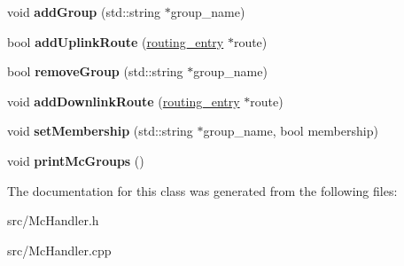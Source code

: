 \begin{DoxyCompactItemize}
\item 
\hypertarget{classMcHandler_a470f9c8360f7f57f626bad5de40489b5}{void {\bfseries add\-Group} (std\-::string $\ast$group\-\_\-name)}\label{classMcHandler_a470f9c8360f7f57f626bad5de40489b5}

\item 
\hypertarget{classMcHandler_a9d98dba49da2ef70676f1263798ed752}{bool {\bfseries add\-Uplink\-Route} (\hyperlink{structrouting__entry}{routing\-\_\-entry} $\ast$route)}\label{classMcHandler_a9d98dba49da2ef70676f1263798ed752}

\item 
\hypertarget{classMcHandler_aa84f097ecdf2b22011112dd85a1590d4}{bool {\bfseries remove\-Group} (std\-::string $\ast$group\-\_\-name)}\label{classMcHandler_aa84f097ecdf2b22011112dd85a1590d4}

\item 
\hypertarget{classMcHandler_a5b2c6085344056125d2499212b57e46a}{void {\bfseries add\-Downlink\-Route} (\hyperlink{structrouting__entry}{routing\-\_\-entry} $\ast$route)}\label{classMcHandler_a5b2c6085344056125d2499212b57e46a}

\item 
\hypertarget{classMcHandler_a831af2812933e2e5c8c90afdc3980244}{void {\bfseries set\-Membership} (std\-::string $\ast$group\-\_\-name, bool membership)}\label{classMcHandler_a831af2812933e2e5c8c90afdc3980244}

\item 
\hypertarget{classMcHandler_ac0899cc07cf9a0d588135984528659ad}{void {\bfseries print\-Mc\-Groups} ()}\label{classMcHandler_ac0899cc07cf9a0d588135984528659ad}

\end{DoxyCompactItemize}


The documentation for this class was generated from the following files\-:\begin{DoxyCompactItemize}
\item 
src/Mc\-Handler.\-h\item 
src/Mc\-Handler.\-cpp\end{DoxyCompactItemize}
